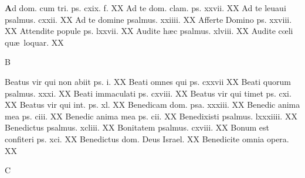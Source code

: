 \documentclass[a5paper,10pt]{book}
\def\ae{æ}
\def\oe{œ}
\begin{document}
\begin{multicols}{2}
\lettrine[lines=2]{\bfseries \color{red} A}{}d dom. cum tri. ps. cxix. f. \hfill XX
\newline Ad te dom. clam. ps. xxvii. \hfill XX
\newline Ad te leuaui psalmus. cxxii. \hfill XX
\newline Ad te domine psalmus. xxiiii. \hfill XX
\newline Afferte Domino ps. xxviii. \hfill XX
\newline Attendite popule ps. lxxvii. \hfill XX
\newline Audite h\ae c psalmus. xlviii. \hfill XX
\newline Audite c\oe li qu\ae \ loquar. \hfill XX
\newline \vspace{-1.75em}
\begin{center}
\color{red} B
\end{center}
\vspace{-.75em}
\par \noindent Beatus vir qui non abiit ps. i. \hfill XX
\newline Beati omnes qui ps. cxxvii \hfill XX
\newline Beati quorum psalmus. xxxi. \hfill XX
\newline Beati immaculati ps. cxviii. \hfill XX
\newline Beatus vir qui timet ps. cxi. \hfill XX
\newline Beatus vir qui int. ps. xl. \hfill XX%
\newline Benedicam dom. psa. xxxiii. \hfill XX
\newline Benedic anima mea ps. ciii. \hfill XX
\newline Benedic anima mea ps. cii. \hfill XX
\newline Benedixisti psalmus. lxxxiiii. \hfill XX
\newline Benedictus psalmus. xcliii. \hfill XX
\newline Bonitatem psalmus. cxviii. \hfill XX
\newline Bonum est confiteri ps. xci. \hfill XX
\newline Benedictus dom. Deus Israel. \hfill XX
\newline Benedicite omnia opera. \hfill XX
\newline \vspace{-1.75em}
\begin{center}
\color{red} C
\end{center}

\end{multicols}
\end{document}
